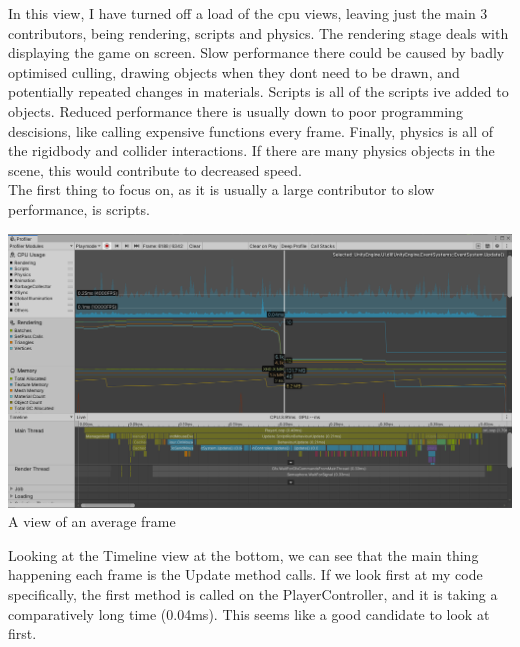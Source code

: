 \documentclass{article}
\begin{document}
In this view, I have turned off a load of the cpu views, leaving just the main 3 contributors, being rendering, scripts and physics.
The rendering stage deals with displaying the game on screen. Slow performance there could be caused by badly optimised culling, drawing objects when they dont need to be drawn, and potentially repeated changes in materials.
Scripts is all of the scripts ive added to objects. Reduced performance there is usually down to poor programming descisions, like calling expensive functions every frame.
Finally, physics is all of the rigidbody and collider interactions. If there are many physics objects in the scene, this would contribute to decreased speed.\\
The first thing to focus on, as it is usually a large contributor to slow performance, is scripts. 
\begin{center}
    \includegraphics[width=\textwidth]{Images/FirstScripts.png}
    A view of an average frame
\end{center}
Looking at the Timeline view at the bottom, we can see that the main thing happening each frame is the Update method calls. If we look first at my code specifically, the first method is called on the PlayerController, and it is taking a comparatively long time (0.04ms). This seems like a good candidate to look at first.
\end{document}
